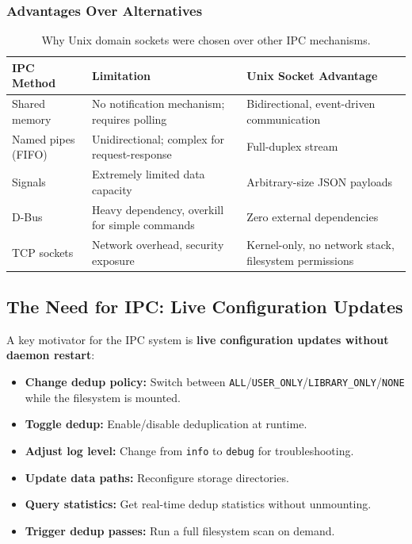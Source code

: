 \documentclass[12pt, a4paper]{article}
\begin{document}
\subsubsection{Advantages Over Alternatives}

\begin{table}[H]
\centering
\small
\begin{tabular}{lp{4cm}p{4cm}}
\toprule
\textbf{IPC Method} & \textbf{Limitation} & \textbf{Unix Socket Advantage} \\
\midrule
Shared memory & No notification mechanism; requires polling & Bidirectional, event-driven communication \\
Named pipes (FIFO) & Unidirectional; complex for request-response & Full-duplex stream \\
Signals & Extremely limited data capacity & Arbitrary-size JSON payloads \\
D-Bus & Heavy dependency, overkill for simple commands & Zero external dependencies \\
TCP sockets & Network overhead, security exposure & Kernel-only, no network stack, filesystem permissions \\
\bottomrule
\end{tabular}
\caption{Why Unix domain sockets were chosen over other IPC mechanisms.}
\end{table}

\subsection{The Need for IPC: Live Configuration Updates}

A key motivator for the IPC system is \textbf{live configuration updates without daemon restart}:

\begin{itemize}
  \item \textbf{Change dedup policy:} Switch between \texttt{ALL}/\texttt{USER\_ONLY}/\texttt{LIBRARY\_ONLY}/\texttt{NONE} while the filesystem is mounted.
  \item \textbf{Toggle dedup:} Enable/disable deduplication at runtime.
  \item \textbf{Adjust log level:} Change from \texttt{info} to \texttt{debug} for troubleshooting.
  \item \textbf{Update data paths:} Reconfigure storage directories.
  \item \textbf{Query statistics:} Get real-time dedup statistics without unmounting.
  \item \textbf{Trigger dedup passes:} Run a full filesystem scan on demand.
\end{itemize}
\end{document}

